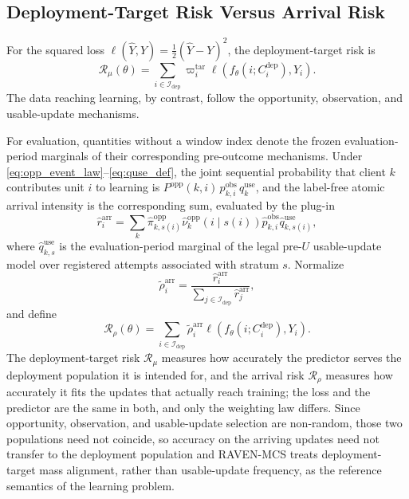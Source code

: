 \documentclass[letterpaper,journal]{IEEEtran}
\begin{document}
\subsection{Deployment-Target Risk Versus Arrival Risk}
\label{subsec:target_risk}

For the squared loss
$\ell(\widehat Y,Y)=\tfrac{1}{2}(\widehat Y-Y)^2$, the deployment-target risk is
\begin{equation}
 \mathcal{R}_{\mu}(\theta)
 =
 \sum_{i\in\mathcal{I}_{\mathrm{dep}}}
 \varpi_i^{\mathrm{tar}}
 \ell\!\left(
 f_{\theta}(i;C_i^{\mathrm{dep}}),Y_i
 \right).
 \label{eq:target_risk}
\end{equation}
The data reaching learning, by contrast, follow the
opportunity, observation, and usable-update mechanisms.

For evaluation, quantities without a window index denote the frozen
evaluation-period marginals of their corresponding pre-outcome mechanisms.
Under \eqref{eq:opp_event_law}--\eqref{eq:quse_def}, the joint sequential
probability that client $k$ contributes unit $i$ to learning is
$P^{\mathrm{opp}}(k,i)\,p^{\mathrm{obs}}_{k,i}\,q^{\mathrm{use}}_{k}$, and the
label-free atomic arrival intensity is the corresponding sum, evaluated by the
plug-in
\begin{equation}
 \widehat r_i^{\mathrm{arr}}
 =
 \sum_k
 \widehat\pi^{\mathrm{opp}}_{k,s(i)}
 \widehat\nu^{\mathrm{opp}}_{k}(i\mid s(i))
 \widehat p^{\mathrm{obs}}_{k,i}
 \widehat q^{\mathrm{use}}_{k,s(i)},
 \label{eq:arrival_intensity}
\end{equation}
where $\widehat q^{\mathrm{use}}_{k,s}$ is the evaluation-period marginal of the
legal pre-$U$ usable-update model over registered attempts associated with
stratum $s$.  Normalize
\begin{equation}
 \widetilde\rho_i^{\mathrm{arr}}
 =
 \frac{\widehat r_i^{\mathrm{arr}}}
 {\sum_{j\in\mathcal{I}_{\mathrm{dep}}}\widehat r_j^{\mathrm{arr}}},
 \label{eq:arrival_distribution}
\end{equation}
and define
\begin{equation}
 \mathcal{R}_{\rho}(\theta)
 =
 \sum_{i\in\mathcal{I}_{\mathrm{dep}}}
 \widetilde\rho_i^{\mathrm{arr}}
 \ell\!\left(
 f_{\theta}(i;C_i^{\mathrm{dep}}),Y_i
 \right).
 \label{eq:arrival_risk}
\end{equation}
The deployment-target risk
$\mathcal{R}_{\mu}$ measures how accurately the predictor serves the deployment
population it is intended for, and the arrival risk $\mathcal{R}_{\rho}$ measures
how accurately it fits the updates that actually reach training; the loss and the
predictor are the same in both, and only the weighting law differs.  Since
opportunity, observation, and usable-update selection are non-random, those two
populations need not coincide, so accuracy on the arriving updates need not
transfer to the deployment population and RAVEN-MCS treats deployment-target mass
alignment, rather than usable-update frequency, as the reference semantics of the
learning problem.
\end{document}
